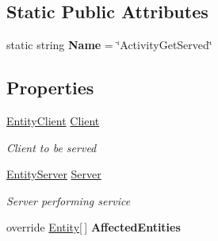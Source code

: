 \subsection*{Static Public Attributes}
\begin{DoxyCompactItemize}
\item 
static string {\bfseries Name} = \char`\"{}Activity\+Get\+Served\char`\"{}\hypertarget{class_simple_queue_example_1_1_model_elements_1_1_activity_get_served_a077a81d222890eb50e60f0872b4371af}{}\label{class_simple_queue_example_1_1_model_elements_1_1_activity_get_served_a077a81d222890eb50e60f0872b4371af}

\end{DoxyCompactItemize}
\subsection*{Properties}
\begin{DoxyCompactItemize}
\item 
\hyperlink{class_simple_queue_example_1_1_model_elements_1_1_entity_client}{Entity\+Client} \hyperlink{class_simple_queue_example_1_1_model_elements_1_1_activity_get_served_a24f6451b1cb6c05770a97b8acdcc6550}{Client}
\begin{DoxyCompactList}\small\item\em Client to be served \end{DoxyCompactList}\item 
\hyperlink{class_simple_queue_example_1_1_model_elements_1_1_entity_server}{Entity\+Server} \hyperlink{class_simple_queue_example_1_1_model_elements_1_1_activity_get_served_a24fd2ccb9ebadb070597b64d58c0dc48}{Server}
\begin{DoxyCompactList}\small\item\em Server performing service \end{DoxyCompactList}\item 
override \hyperlink{class_simulation_core_1_1_h_c_c_m_elements_1_1_entity}{Entity}\mbox{[}$\,$\mbox{]} {\bfseries Affected\+Entities}\hypertarget{class_simple_queue_example_1_1_model_elements_1_1_activity_get_served_a5291c35ffc6c690691f080633ebbad09}{}\label{class_simple_queue_example_1_1_model_elements_1_1_activity_get_served_a5291c35ffc6c690691f080633ebbad09}

\end{DoxyCompactItemize}


